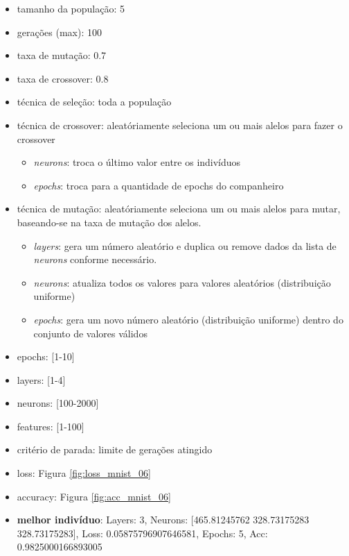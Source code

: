 \documentclass[twoside,conference,a4paper]{IEEEtran}
\begin{document}
\begin{itemize}
    \item tamanho da população: 5
    \item gerações (max): 100
    \item taxa de mutação: 0.7
    \item taxa de crossover: 0.8
    \item técnica de seleção: toda a população
    \item técnica de crossover: aleatóriamente seleciona um ou mais alelos para fazer o crossover
    \begin{itemize}
        \item \emph{neurons}: troca o último valor entre os indivíduos
        \item \emph{epochs}: troca para a quantidade de epochs do companheiro
    \end{itemize}
    \item técnica de mutação: aleatóriamente seleciona um ou mais alelos para mutar, baseando-se na taxa de mutação dos alelos.
    \begin{itemize}
        \item \emph{layers}: gera um número aleatório e duplica ou remove dados da lista de \emph{neurons} conforme necessário.
        \item \emph{neurons}: atualiza todos os valores para valores aleatórios (distribuição uniforme)
        \item \emph{epochs}: gera um novo número aleatório (distribuição uniforme) dentro do conjunto de valores válidos
    \end{itemize}
    \item epochs: [1-10]
    \item layers: [1-4]
    \item neurons: [100-2000]
    \item features: [1-100]
    \item critério de parada: limite de gerações atingido
    \item loss: Figura \ref{fig:loss_mnist_06}
    \item accuracy: Figura \ref{fig:acc_mnist_06}
    \item \textbf{melhor indivíduo}: Layers: 3, Neurons: [465.81245762 328.73175283 328.73175283], Loss: 0.05875796907646581, Epochs: 5, Acc: 0.9825000166893005
\end{itemize}
\end{document}
